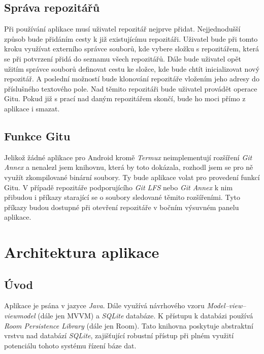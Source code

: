         \subsection{Správa repozitářů}
        Při používání aplikace musí uživatel repozitář nejprve přidat. Nejjednodušší způsob bude přidáním cesty k již existujícímu repozitáři. Uživatel bude při tomto kroku využívat externího správce souborů, kde vybere složku s repozitářem, která se při potvrzení přidá do seznamu všech repozitářů. Dále bude uživatel opět užitím správce souborů definovat cestu ke složce, kde bude chtít inicializovat nový repozitář. A poslední možností bude klonování repozitáře vložením jeho adresy do příslušného textového pole. Nad těmito repozitáři bude uživatel provádět operace Gitu. Pokud již s prací nad daným repozitářem skončí, bude ho moci přímo z aplikace i smazat.

        \subsection{Funkce Gitu}
        Jelikož žádné aplikace pro Android kromě \emph{Termux} neimplementují rozšíření \emph{Git Annex} a nenalezl jsem knihovnu, která by toto dokázala, rozhodl jsem se pro ně využít zkompilované binární soubory. Ty bude aplikace volat pro provedení funkcí Gitu.
        V případě repozitáře podporujícího \emph{Git LFS} nebo \emph{Git Annex} k nim přibudou i příkazy starající se o soubory sledované těmito rozšířeními. Tyto příkazy budou dostupné při otevření repozitáře v bočním výsuvném panelu aplikace.

    \section{Architektura aplikace}

        \subsection{Úvod}
        Aplikace je psána v jazyce \emph{Java}. Dále využívá návrhového vzoru \emph{Model–view–viewmodel} (dále jen MVVM) a \emph{SQLite} databáze. K přístupu k databázi používá \emph{Room Persistence Library} (dále jen Room). Tato knihovna poskytuje abstraktní vrstvu nad databází \emph{SQLite}, zajišťující robustní přístup při plném využití potenciálu tohoto systému řízení báze dat.


